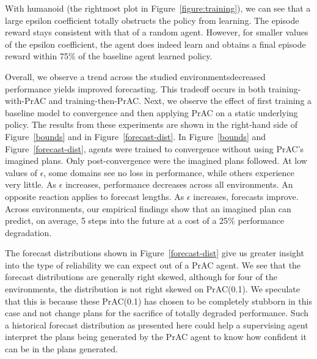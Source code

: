 \documentclass[letterpaper]{article} %
\begin{document}
With humanoid (the rightmost plot in Figure~\ref{figure:training}), we can see that a large epsilon coefficient totally obstructs the policy from learning. The episode reward stays consistent with that of a random agent. However, for smaller values of the epsilon coefficient, the agent does indeed learn and obtains a final episode reward within 75\% of the baseline agent learned policy. 

Overall, we observe a trend across the studied environments\textemdash decreased performance yields improved forecasting. This tradeoff occurs in both training-with-PrAC and training-then-PrAC. Next, we observe the effect of first training a baseline model to convergence and then applying PrAC on a static underlying policy. The results from these experiments are shown in the right-hand side of Figure~\ref{bounds} and in Figure~\ref{forecast-dist}. In Figure~\ref{bounds} and Figure~\ref{forecast-dist}, agents were trained to convergence without using PrAC's imagined plans. Only post-convergence were the imagined plans followed. At low values of $\epsilon$, some domains see no loss in performance, while others experience very little. As $\epsilon$ increases, performance decreases across all environments. An opposite reaction applies to forecast lengths. As $\epsilon$ increases, forecasts improve. Across environments, our empirical findings show that an imagined plan can predict, on average, 5 steps into the future at a cost of a 25\% performance degradation.

The forecast distributions shown in Figure~\ref{forecast-dist} give us greater insight into the type of reliability we can expect out of a PrAC agent. We see that the forecast distributions are generally right skewed, although for four of the environments, the distribution is not right skewed on PrAC(0.1). We speculate that this is because these PrAC(0.1) has chosen to be completely stubborn in this case and not change plans for the sacrifice of totally degraded performance. Such a historical forecast distribution as presented here could help a supervising agent interpret the plans being generated by the PrAC agent to know how confident it can be in the plans generated.


\end{document}
